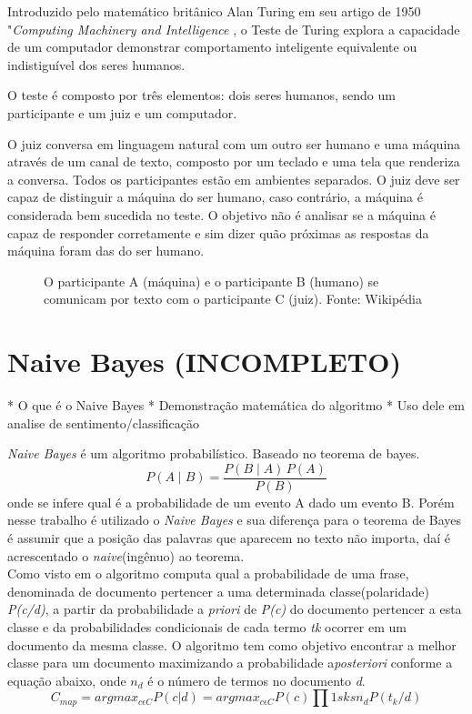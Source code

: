 Introduzido pelo matemático britânico Alan Turing em seu artigo de 1950 "\textit{Computing Machinery and Intelligence} \cite{turing1950computing}, o Teste de Turing explora a capacidade de um computador demonstrar comportamento inteligente equivalente ou indistiguível dos seres humanos.

O teste é composto por três elementos: dois seres humanos, sendo um participante e um juiz e um computador.

O juiz conversa em linguagem natural com um outro ser humano e uma máquina através de um canal de texto, composto por um teclado e uma tela que renderiza a conversa. Todos os participantes estão em ambientes separados. O juiz deve ser capaz de distinguir a máquina do ser humano, caso contrário, a máquina é considerada bem sucedida no teste. O objetivo não é analisar se a máquina é capaz de responder corretamente e sim dizer quão próximas as respostas da máquina foram das do ser humano.  

\begin{figure}[!h]
	\centering{}
	\caption{O participante A (máquina) e o participante B (humano) se comunicam por texto com o participante C (juiz). Fonte: Wikipédia}
	\label{uni}
\end{figure}


\section{Naive Bayes (INCOMPLETO)}\label{sec:naive_bayes}
* O que é o Naive Bayes
* Demonstração matemática do algoritmo
* Uso dele em analise de sentimento/classificação


\emph{Naive Bayes} é um algoritmo probabilístico. Baseado no teorema de bayes. $$ P(A \mid B) = \frac{P(B \mid A) \, P(A)}{P(B)} $$ onde se infere qual é a probabilidade de um evento A dado um evento B. Porém nesse trabalho é utilizado o \emph{Naive Bayes} e sua diferença para o teorema de Bayes é assumir que a posição das palavras que aparecem no texto não importa, daí é acrescentado o \emph{naive}(ingênuo) ao teorema.
\\ Como visto em \cite{lucca2013implementaccao} o algoritmo computa qual a probabilidade de uma frase, denominada de documento pertencer a uma determinada classe(polaridade) \emph{P(c/d)}, a partir da probabilidade a \emph{priori} de \emph{P(c)} do documento pertencer a esta classe e da probabilidades condicionais de cada termo \emph{tk} ocorrer em um documento da mesma classe. O algoritmo tem como objetivo encontrar a melhor classe para um documento maximizando a probabilidade a\emph{posteriori} conforme a equação abaixo, onde $ n_{d} $ é o número de termos no documento \emph{d}. $$ C_{map}= argmax_{c \epsilon C}P(c|d)=argmax_{c \epsilon C}P(c)\prod 1sksn_{d}P(t_{k}/d) $$